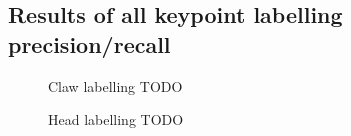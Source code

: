 \begin{appendices}
\sectionfont{\Large}




\section{Results of all keypoint labelling precision/recall}

\begin{figure}[H]
\centering
Claw labelling TODO
\end{figure}

\begin{figure}[H]
\centering
Head labelling TODO
\end{figure}


%

\end{appendices}